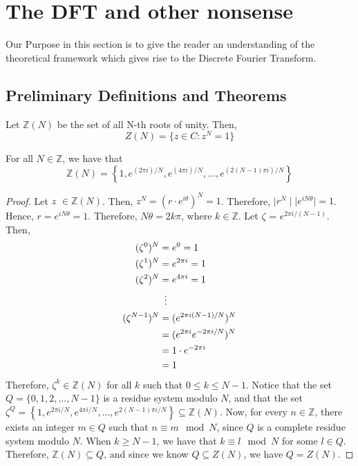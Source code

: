 \documentclass[../article.tex]{subfiles}
\begin{document}
\section{The DFT and other nonsense}
Our Purpose in this section is to give the reader an understanding of the theoretical framework which gives rise to the Discrete Fourier Transform.

\subsection{Preliminary Definitions and Theorems}


\begin{definition}
Let $\mathbb{Z}(N)$ be the set of all N-th roots of unity. Then,
 \[Z(N) = \{z \in C : z^N = 1 \}\]
\end{definition}
\begin{theorem}
For all $N \in \mathbb{Z}$, we have that
\[\mathbb{Z}(N)= \left\{1, e^{(2 \pi i)/N}, e^{(4 \pi i)/N}, \ldots, e^{(2(N-1) \pi i)/N}\right\}\]
\end{theorem}

\begin{proof}
Let $z$ $\in \mathbb{Z}(N)$. Then, $z^N = (r \cdot e^{i \theta})^N = 1$. Therefore, $\mid r^N \mid \mid e^{i N \theta} \mid = 1$. Hence, $r = e^{i N \theta} = 1$. Therefore, $N\theta = 2k\pi$, where $k \in \mathbb{Z}$. Let $\zeta$ = $e^{2 \pi i /(N-1)}$. Then,
\begin{align*}
	(\zeta^0)^N &= e^0 = 1 \\
	(\zeta^1)^N &= e^{2 \pi i} = 1 \\
	(\zeta^2)^N &= e^{4 \pi i} = 1 \\
	{} &\vdotswithin{=}\\
	(\zeta^{N-1})^N &= (e^{2 \pi i(N-1)/N})^N \\
	{} &= (e^{2 \pi i}e^{-2 \pi i/N})^N \\
	{} &= 1 \cdot e^{-2 \pi i} \\
	{} &= 1
\end{align*}
Therefore, $\zeta^k \in \mathbb{Z}(N)$ for all $k$ such that $0 \leq k \leq N-1$. Notice that the set $Q = \{0, 1, 2, \ldots, N-1\}$ is a residue system modulo $N$, and that the set $\zeta^Q = \left\{1, e^{2 \pi i/N}, e^{4 \pi i/N}, \ldots, e^{2(N-1) \pi i/N}\right\} \subseteq \mathbb{Z}(N) $.
Now, for every $n \in \mathbb{Z}$, there exists an integer $m \in Q$ such that $n \equiv m \mod N$, since $Q$ is a complete residue system modulo $N$. When $k \geq N-1$, we have that $k \equiv l \mod N$ for some $l \in Q$. Therefore, $\mathbb{Z}(N) \subseteq Q$, and since we know $Q \subseteq Z(N)$, we have $Q = Z(N)$.
\end{proof}
\end{document}

